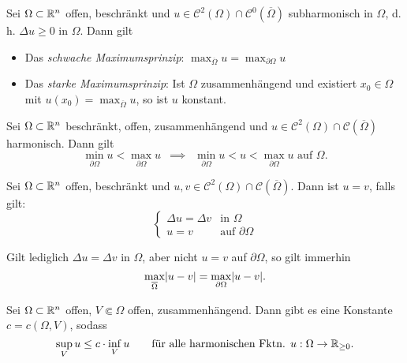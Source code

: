\documentclass{cheat-sheet}
\begin{document}
\begin{satz}
  Sei $\Omega \subset \mathbb{R}^n$ offen, beschränkt und $u \in \mathcal{C}^2(\Omega) \cap \mathcal{C}^0(\overline{\Omega})$ subharmonisch in $\Omega$, d.\,h. $\Delta u \geq 0$ in $\Omega$. Dann gilt
  \begin{itemize}
    \item Das \emph{schwache Maximumsprinzip}: $\max_{\overline{\Omega}} u = \max_{\partial \Omega} u$
    \item Das \emph{starke Maximumsprinzip}: Ist $\Omega$ zusammenhängend und existiert $x_0 \in \Omega$ mit $u(x_0) = \max_{\overline{\Omega}} u$, so ist $u$ konstant.
  \end{itemize}
\end{satz}


\begin{bem}
  Sei $\Omega \subset \mathbb{R}^n$ beschränkt, offen, zusammenhängend und $u \in \mathcal{C}^2(\Omega) \cap \mathcal{C}(\overline{\Omega})$ harmonisch. Dann gilt
  \[ \min_{\partial \Omega} u < \max_{\partial \Omega} u \enspace\implies\enspace \min_{\partial \Omega} u < u < \max_{\partial \Omega} u \text{ auf $\Omega$}. \]
\end{bem}

\begin{kor}[Eindeutigkeit]
  Sei $\Omega \subset \mathbb{R}^n$ offen, beschränkt und $u, v \in \mathcal{C}^2(\Omega) \cap \mathcal{C}(\overline{\Omega})$. Dann ist $u = v$, falls gilt:
  \[
    \left\{ \begin{array}{ll}
      \Delta u = \Delta v & \text{in $\Omega$}\\
      u = v & \text{auf $\partial \Omega$}
    \end{array} \right.
  \]
\end{kor}

\begin{bem}
  Gilt lediglich $\Delta u = \Delta v$ in $\Omega$, aber nicht $u = v$ auf $\partial \Omega$, so gilt immerhin
  \[ \max_{\overline{\Omega}} \lvert u - v\rvert = \max_{\partial \Omega} \lvert u - v\rvert. \]
\end{bem}


\begin{satz}
  Sei $\Omega \subset \mathbb{R}^n$ offen, $V \Subset \Omega$ offen, zusammenhängend. Dann gibt es eine Konstante $c = c(\Omega, V)$, sodass
  \[
    \sup_{V} u \leq c \cdot \inf_{V} u
    \qquad \text{für alle harmonischen Fktn. $u : \Omega \to \mathbb{R}_{\geq 0}$.}
  \]
\end{satz}
\end{document}
